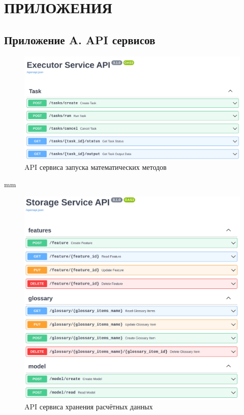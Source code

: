 \section*{\large{ПРИЛОЖЕНИЯ}}
\label{appendix}

\renewcommand{\thefigure}{\arabic{figure}}

\setcounter{figure}{0}

\subsection*{\large{Приложение A. API сервисов}}
\begin{figure}[H]
	\includegraphics[width=\textwidth]{applications/pictures/executor_swagger}
	\caption{API сервиса запуска математических методов}
	\label{pic:application__executor-swagger}
\end{figure}
 mm
\begin{figure}[H]
	\includegraphics[width=\textwidth]{applications/pictures/storage_swagger}
	\caption{API сервиса хранения расчётных данных}
	\label{pic:application__storage-swagger}
\end{figure}
